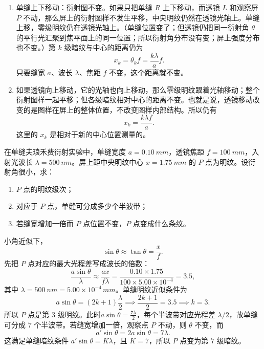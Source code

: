 \documentclass[lang=cn,11pt]{elegantbook}
\begin{document}
\begin{theorem}[单缝衍射的动态变化]
\begin{enumerate}
\item 单缝上下移动：衍射图不变。如果只把单缝 \(R\) 上下移动，而透镜 \(L\) 和观察屏 \(P\) 不动，那么屏上的衍射图样不发生平移，中央明纹仍然在透镜光轴上。单缝上移，零级明纹仍在透镜光轴上。（单缝位置变了；但透镜仍把同一衍射角 \(\theta\) 的平行光汇聚到焦平面上的同一位置；所以衍射角分布没有变；屏上强度分布也不变。）第 \(k\) 级暗纹与中心的距离仍为
\[
x_k=\theta_k f=\frac{k\lambda}{a}f.
\]只要缝宽 \(a\)、波长 \(\lambda\)、焦距 \(f\) 不变，这个距离就不变。
\item 如果透镜向上移动，它的光轴也向上移动，那么零级明纹跟着光轴移动；整个衍射图样一起平移；但各级暗纹相对中心的距离不变。也就是说，透镜移动改变的是图样在屏上的整体位置，不改变图样内部结构。所以仍有
\[
x_k=\frac{k\lambda f}{a}.
\]这里的 \(x_k\) 是相对于新的中心位置测量的。
\end{enumerate}    
\end{theorem}


\begin{exercise}
在单缝夫琅禾费衍射实验中，单缝宽度 \(a=\SI{0.10}{mm}\)，透镜焦距 \(f=\SI{100}{mm}\)，入射光波长 \(\lambda=\SI{500}{nm}\)。屏上距中央明纹中心 \(x=\SI{1.75}{mm}\) 的 \(P\) 点为明纹。设衍射角很小，求：
\begin{enumerate}
\item \(P\) 点的明纹级次；
\item 对应于 \(P\) 点，单缝可分成多少个半波带；
\item 若缝宽增加一倍而 \(P\) 点位置不变，\(P\) 点变成什么条纹。
\end{enumerate}
\end{exercise}

\begin{solution}
小角近似下，
\[
\sin\theta\approx\tan\theta=\frac{x}{f}.
\]
先把 \(P\) 点对应的最大光程差写成波长的倍数：
\[
\frac{a\sin\theta}{\lambda}\approx\frac{ax}{f\lambda}
=\frac{0.10\times1.75}{100\times 5.00\times10^{-4}}=3.5,
\]
其中 \(\lambda=\SI{500}{nm}=5.00\times10^{-4}\,\si{mm}\)。单缝明纹近似条件为
\[
a\sin\theta=(2k+1)\frac{\lambda}{2}\implies\frac{2k+1}{2}=3.5\implies k=3.
\]
所以 \(P\) 点是第 \(3\) 级明纹。此时$a\sin\theta=\frac{7\lambda}{2}$，每个半波带对应光程差 \(\lambda/2\)，故单缝可分成 \(7\) 个半波带。若缝宽增加一倍，观察点 \(P\) 不动，则 \(\theta\) 不变，而
\[
a'\sin\theta=2a\sin\theta=7\lambda.
\]
这满足单缝暗纹条件 \(a'\sin\theta=K\lambda\)，且 \(K=7\)，所以 \(P\) 点变为第 \(7\) 级暗纹。
\end{solution}
\end{document}

